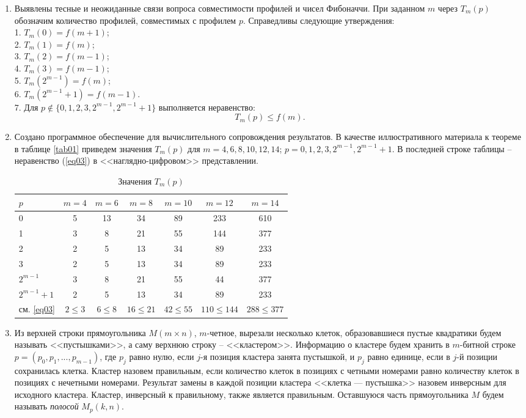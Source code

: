 \begin{enumerate}
	\item 
Выявлены тесные и неожиданные связи вопроса совместимости профилей и чисел Фибоначчи.
При заданном $m$ через $T_m(p)$   обозначим количество профилей, совместимых с профилем $p$.
Справедливы следующие утверждения:\\
1. $T_m(0)=f(m+1)$;\\
2. $T_m(1) = f(m)$;\\
3. $T_m(2)=f(m-1)$;\\
4. $T_m(3)=f(m-1)$;\\
5. $T_m(2^{m-1})=f(m)$;\\
6. $T_m(2^{m-1}+1)=f(m-1)$.\\
7. Для $p\notin \{0,1,2,3,2^{m-1}, 2^{m-1}+1\}$
выполняется неравенство: 
\begin {equation} \label {eq03}
T_m(p) \le f(m).
\end{equation}
\item
Создано программное обеспечение для вычислительного сопровождения результатов.
В качестве иллюстративного материала к теореме в таблице \ref{tab01} приведем значения $T_m(p)$ для $m=4,6,8,10,12,14$; $p=0, 1, 2, 3, 2^{m-1}, 2^{m-1}+1$. В последней строке таблицы  -- неравенство (\ref{eq03}) в <<наглядно-цифровом>> представлении.

\begin {table}[ht]
\caption 
{Значения $T_m(p)$ }
\centering { 
\label {tab01}
}
\footnotesize{
\begin{tabular} {|p{2cm}|c|c|c|c|c|c| }
\hline
$p$&$m=4$&$m=6$&$m=8$&$m=10$&$m=12$&$m=14$\\
\hline
\hline
0&5&13&34&89&233&610\\
\hline
1&3&8&21&55&144&377\\
\hline
2&2&5&13&34&89&233\\
\hline
3&2&5&13&34&89&233\\
\hline
$2^{m-1}$&3&8&21&55&44&377\\
\hline
$2^{m-1}+1$&2&5&13&34&89&233\\
\hline
\hline
см. \eqref{eq03}&$2\leq 3$&$6\leq 8 $&$16\leq 21$&$42\leq 55$&$110\leq 144$&$288 \leq 377$\\
\hline
\end{tabular}
}
\end{table}
\item 
Из верхней строки прямоугольника $M(m\times n)$, $m$-четное, вырезали несколько клеток, образовавшиеся пустые квадратики будем называть <<пустышками>>, а саму верхнюю строку -- <<кластером>>. Информацию о кластере будем хранить в $m$-битной строке $p=(p_0, p_1, ..., p_{m-1})$, где 
$p_j$ равно нулю, если $j$-я позиция кластера занята пустышкой, и $p_j$ равно единице, если в $j$-й позиции сохранилась клетка. Кластер назовем правильным, если количество клеток в позициях с четными номерами равно количеству клеток в позициях с нечетными номерами. Результат замены в каждой позиции кластера <<клетка --- пустышка>> назовем инверсным для исходного кластера. Кластер, инверсный к правильному, также является правильным.
Оставшуюся часть прямоугольника $M$ будем называть {\it полосой} $M_p(k,n)$.


\end{enumerate}
